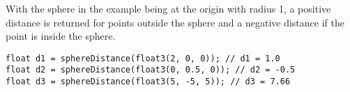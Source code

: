 \noindent
With the sphere in the example being at the origin with radius 1, a positive distance is returned for points outside the sphere and a negative distance if the point is inside the sphere.
\begin{lstlisting}[language=HLSL]
float d1 = sphereDistance(float3(2, 0, 0)); // d1 = 1.0
float d2 = sphereDistance(float3(0, 0.5, 0)); // d2 = -0.5
float d3 = sphereDistance(float3(5, -5, 5)); // d3 = 7.66
\end{lstlisting}